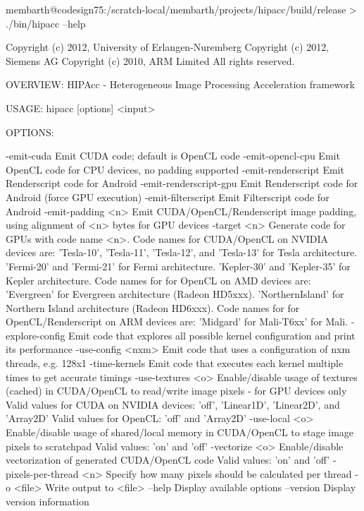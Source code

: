 \lstset{language=bash}
\begin{code}
membarth@codesign75:/scratch-local/membarth/projects/hipacc/build/release > ./bin/hipacc --help

Copyright (c) 2012, University of Erlangen-Nuremberg
Copyright (c) 2012, Siemens AG
Copyright (c) 2010, ARM Limited
All rights reserved.

OVERVIEW: HIPAcc - Heterogeneous Image Processing Acceleration framework

USAGE:  hipacc [options] <input>

OPTIONS:

  -emit-cuda              Emit CUDA code; default is OpenCL code
  -emit-opencl-cpu        Emit OpenCL code for CPU devices, no padding supported
  -emit-renderscript      Emit Renderscript code for Android
  -emit-renderscript-gpu  Emit Renderscript code for Android (force GPU execution)
  -emit-filterscript      Emit Filterscript code for Android
  -emit-padding <n>       Emit CUDA/OpenCL/Renderscript image padding, using alignment of <n> bytes for GPU devices
  -target <n>             Generate code for GPUs with code name <n>.
                          Code names for CUDA/OpenCL on NVIDIA devices are:
                            'Tesla-10', 'Tesla-11', 'Tesla-12', and 'Tesla-13' for Tesla architecture.
                            'Fermi-20' and 'Fermi-21' for Fermi architecture.
                            'Kepler-30' and 'Kepler-35' for Kepler architecture.
                          Code names for for OpenCL on AMD devices are:
                            'Evergreen'      for Evergreen architecture (Radeon HD5xxx).
                            'NorthernIsland' for Northern Island architecture (Radeon HD6xxx).
                          Code names for for OpenCL/Renderscript on ARM devices are:
                            'Midgard' for Mali-T6xx' for Mali.
  -explore-config         Emit code that explores all possible kernel configuration and print its performance
  -use-config <nxm>       Emit code that uses a configuration of nxm threads, e.g. 128x1
  -time-kernels           Emit code that executes each kernel multiple times to get accurate timings
  -use-textures <o>       Enable/disable usage of textures (cached) in CUDA/OpenCL to read/write image pixels - for GPU devices only
                          Valid values for CUDA on NVIDIA devices: 'off', 'Linear1D', 'Linear2D', and 'Array2D'
                          Valid values for OpenCL: 'off' and 'Array2D'
  -use-local <o>          Enable/disable usage of shared/local memory in CUDA/OpenCL to stage image pixels to scratchpad
                          Valid values: 'on' and 'off'
  -vectorize <o>          Enable/disable vectorization of generated CUDA/OpenCL code
                          Valid values: 'on' and 'off'
  -pixels-per-thread <n>  Specify how many pixels should be calculated per thread
  -o <file>               Write output to <file>
  --help                  Display available options
  --version               Display version information
\end{code}


